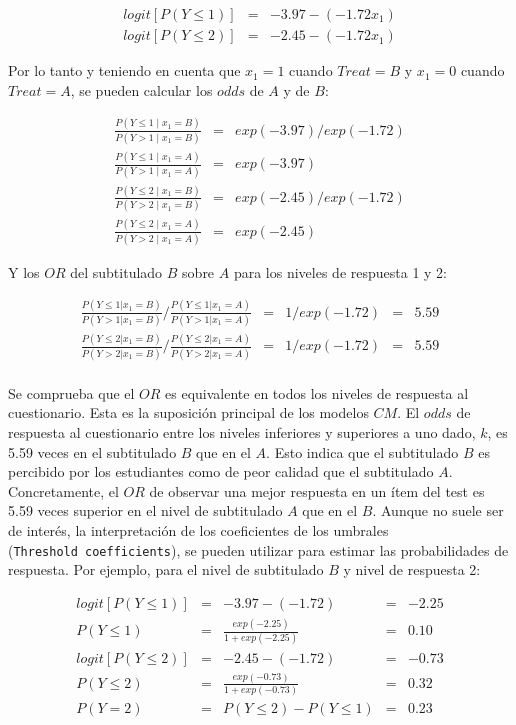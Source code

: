 \documentclass[
  12pt,
  a4paper,
  extrafontsizes,
  onecolumn,
  openright,
  table]{memoir}
\begin{document}
\[
\begin{aligned}
logit [P(Y \le 1)] & = & -3.97 - (-1.72 x_1) \\
logit [P(Y \le 2)] & = & -2.45 - (-1.72 x_1)
\end{aligned}
\]

Por lo tanto y teniendo en cuenta que \(x_1 = 1\) cuando \(Treat = B\) y
\(x_1 = 0\) cuando \(Treat = A\), se pueden calcular los \(odds\) de
\(A\) y de \(B\):

\[
\begin{aligned}
\frac{P(Y \le 1 \mid x_1 = B)}{P(Y > 1 \mid x_1 = B)} & = & exp(-3.97)/exp(-1.72) \\
\frac{P(Y \le 1 \mid x_1 = A)}{P(Y > 1 \mid x_1 = A)} & = & exp(-3.97) \\
\frac{P(Y \le 2 \mid x_1 = B)}{P(Y > 2 \mid x_1 = B)} & = & exp(-2.45)/exp(-1.72) \\
\frac{P(Y \le 2 \mid x_1 = A)}{P(Y > 2 \mid x_1 = A)} & = & exp(-2.45)
\end{aligned}
\]

Y los \(OR\) del subtitulado \(B\) sobre \(A\) para los niveles de
respuesta 1 y 2:

\[
\begin{aligned}
\frac{P(Y \le 1 | x_1=B)}{P(Y > 1 | x_1=B)} / \frac{P(Y \le 1 | x_1=A)}{P(Y > 1 | x_1=A)} & = & 1/exp(-1.72) & = & 5.59 \\
\frac{P(Y \le 2 | x_1=B)}{P(Y > 2 | x_1=B)} / \frac{P(Y \le 2 | x_1=A)}{P(Y > 2 | x_1=A)} & = & 1/exp(-1.72) & = & 5.59 \\
\end{aligned}
\]

Se comprueba que el \(OR\) es equivalente en todos los niveles de
respuesta al cuestionario. Esta es la suposición principal de los
modelos \(CM\). El \(odds\) de respuesta al cuestionario entre los
niveles inferiores y superiores a uno dado, \(k\), es 5.59 veces en el
subtitulado \(B\) que en el \(A\). Esto indica que el subtitulado \(B\)
es percibido por los estudiantes como de peor calidad que el subtitulado
\(A\). Concretamente, el \(OR\) de observar una mejor respuesta en un
ítem del test es 5.59 veces superior en el nivel de subtitulado \(A\)
que en el \(B\). Aunque no suele ser de interés, la interpretación de
los coeficientes de los umbrales (\texttt{Threshold\ coefficients}), se
pueden utilizar para estimar las probabilidades de respuesta. Por
ejemplo, para el nivel de subtitulado \(B\) y nivel de respuesta 2:

\[
\begin{aligned}
logit [P(Y \le 1)] & = & -3.97 - (-1.72) & = & -2.25 \\
P(Y \le 1) & = & \frac{exp(-2.25)}{1 + exp(-2.25)} & = & 0.10 \\
logit [P(Y \le 2)] & = & -2.45 - (-1.72) & = & -0.73 \\
P(Y \le 2) & = & \frac{exp(-0.73)}{1 + exp(-0.73)} & = & 0.32 \\
P(Y = 2) & = & P(Y \le 2) - P(Y \le 1) & = &  0.23 
\end{aligned}
\]
\end{document}
